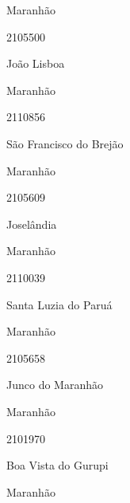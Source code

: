\documentclass[
  letterpaper,
]{report}
\begin{document}
\n    

\n    

\n      

Maranhão

\n      

2105500

\n      

João Lisboa

\n    

\n    

\n      

Maranhão

\n      

2110856

\n      

São Francisco do Brejão

\n    

\n    

\n      

Maranhão

\n      

2105609

\n      

Joselândia

\n    

\n    

\n      

Maranhão

\n      

2110039

\n      

Santa Luzia do Paruá

\n    

\n    

\n      

Maranhão

\n      

2105658

\n      

Junco do Maranhão

\n    

\n    

\n      

Maranhão

\n      

2101970

\n      

Boa Vista do Gurupi

\n    

\n    

\n      

Maranhão
\end{document}
